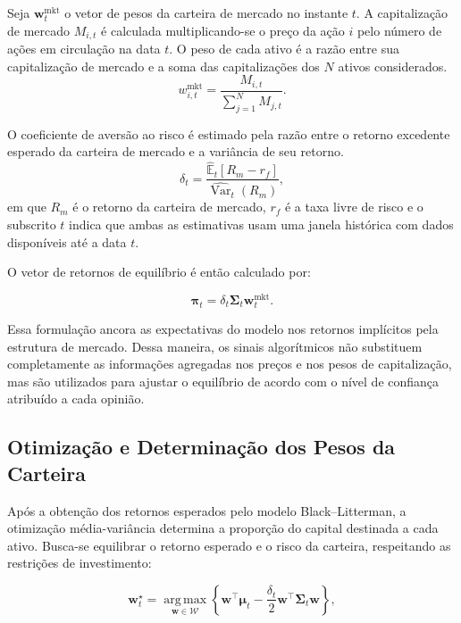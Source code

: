 Seja $\boldsymbol{w}_{t}^{\mathrm{mkt}}$ o vetor de pesos da carteira de
mercado no instante $t$. A capitalização de mercado $M_{i,t}$ é calculada
multiplicando-se o preço da ação $i$ pelo número de ações em circulação na
data $t$. O peso de cada ativo é a razão entre sua capitalização de mercado
e a soma das capitalizações dos $N$ ativos considerados.
\[
    w_{i,t}^{\mathrm{mkt}} =
    \frac{M_{i,t}}{\sum_{j=1}^{N} M_{j,t}}.
\]

O coeficiente de aversão ao risco é estimado pela razão entre o retorno
excedente esperado da carteira de mercado e a variância de seu retorno.
\begin{equation}
    \delta_t =
    \frac{\widehat{\mathbb{E}}_t\left[R_m - r_f\right]}
         {\widehat{\operatorname{Var}}_t\left(R_m\right)},
    \label{eq:delta_rolling}
\end{equation}
\noindent em que $R_m$ é o retorno da carteira de mercado, $r_f$ é a taxa
livre de risco e o subscrito $t$ indica que ambas as estimativas usam uma
janela histórica com dados disponíveis até a data $t$.

O vetor de retornos de equilíbrio é então calculado por:

\begin{equation}
    \boldsymbol{\pi}_t
    =
    \delta_t
    \boldsymbol{\Sigma}_t
    \boldsymbol{w}_{t}^{\mathrm{mkt}}.
    \label{eq:prior_rolling}
\end{equation}

Essa formulação ancora as expectativas do modelo nos retornos implícitos pela estrutura de mercado. Dessa maneira, os sinais algorítmicos não substituem completamente as informações agregadas nos preços e nos pesos de capitalização, mas são utilizados para ajustar o equilíbrio de acordo com o nível de confiança atribuído a cada opinião.

\subsection{Otimização e Determinação dos Pesos da Carteira}
\label{subsec:otimizacao_pesos}

Após a obtenção dos retornos esperados pelo modelo
Black--Litterman, a otimização média-variância determina
a proporção do capital destinada a cada ativo. Busca-se
equilibrar o retorno esperado e o risco da carteira,
respeitando as restrições de investimento:

\begin{equation}
    \boldsymbol{w}_t^{\star}
    =
    \underset{
        \boldsymbol{w}\in\mathcal{W}
    }{\operatorname{arg\,max}}
    \left\{
        \boldsymbol{w}^{\top}\boldsymbol{\mu}_t
        -
        \frac{\delta_t}{2}
        \boldsymbol{w}^{\top}
        \boldsymbol{\Sigma}_t
        \boldsymbol{w}
    \right\},
    \label{eq:pesos_brutos}
\end{equation}

